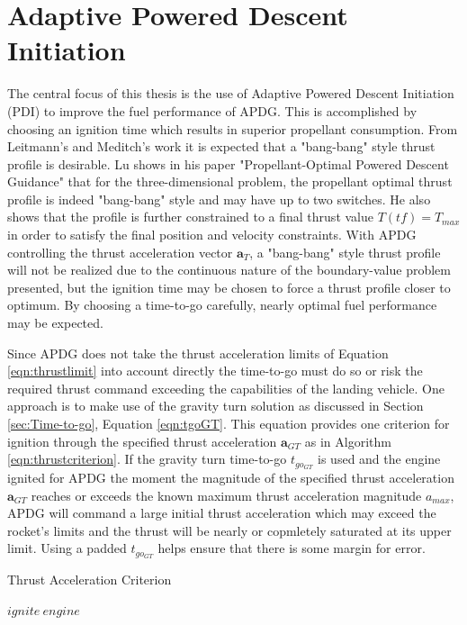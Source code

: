 \section{Adaptive Powered Descent Initiation} \label{sec:PDI}
The central focus of this thesis is the use of Adaptive Powered Descent Initiation (PDI) to improve the fuel performance of APDG. This is accomplished by choosing an ignition time which results in superior propellant consumption. From Leitmann's\:\cite{LEITMANN} and Meditch's\:\cite{MEDITCH} work it is expected that a "bang-bang" style thrust profile is desirable. Lu shows in his paper "Propellant-Optimal Powered Descent Guidance" that for the three-dimensional problem, the propellant optimal thrust profile is indeed "bang-bang" style and may have up to two switches. He also shows that the profile is further constrained to a final thrust value $T(tf) = T_{max}$ in order to satisfy the final position and velocity constraints. With APDG controlling the thrust acceleration vector $\bm{a}_T$, a "bang-bang" style thrust profile will not be realized due to the continuous nature of the boundary-value problem presented, but the ignition time may be chosen to force a thrust profile closer to optimum. By choosing a time-to-go carefully, nearly optimal fuel performance may be expected. 

Since APDG does not take the thrust acceleration limits of Equation \ref{eqn:thrustlimit} into account directly the time-to-go must do so or risk the required thrust command exceeding the capabilities of the landing vehicle. One approach is to make use of the gravity turn solution as discussed in Section \ref{sec:Time-to-go}, Equation \ref{eqn:tgoGT}. This equation provides one criterion for ignition through the specified thrust acceleration $\bm{a}_{GT}$ as in Algorithm \ref{eqn:thrustcriterion}. If the gravity turn time-to-go $t_{go_{GT}}$ is used and the engine ignited for APDG the moment the magnitude of the specified thrust acceleration $\bm{a}_{GT}$ reaches or exceeds the known maximum thrust acceleration magnitude $a_{max}$, APDG will command a large initial thrust acceleration which may exceed the rocket's limits and the thrust will be nearly or copmletely saturated at its upper limit. Using a padded $t_{go_{GT}}$ helps ensure that there is some margin for error.

\begin{algorithm}
	\caption{Thrust Acceleration Criterion}\label{eqn:thrustcriterion}
	\begin{algorithmic}[1]
			\State $ ignite\: engine $
		\EndIf
	\end{algorithmic}
\end{algorithm}

